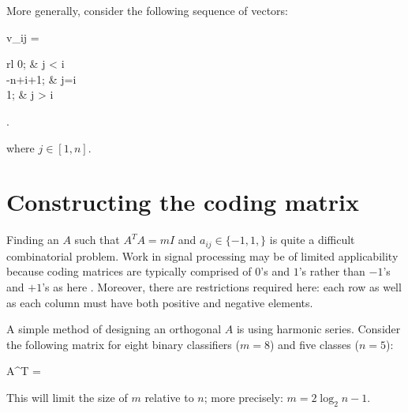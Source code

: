 More generally, consider the following sequence of vectors:
\begin{eqnnon}
	v_{ij} =  \left \lbrace \begin{array}{rl}
			0; & j < i \\
			-n+i+1; & j=i \\
			1; & j > i
		\end{array} \right .
\end{eqnnon}
where $j \in [1, n]$. \citep{Boyd_Vandenberghe2004}


\section{Constructing the coding matrix}

Finding an $A$ such that $A^T A = m I$ and $a_{ij} \in \lbrace -1, 1, \rbrace$
is quite a difficult combinatorial problem.
Work in signal processing may be of limited applicability because coding
matrices are typically comprised of $0$'s and $1$'s rather than $-1$'s and $+1$'s
as here \citep{Hedayat_etal1999,Panse_etal2014}.
Moreover, there are restrictions required here: 
each row as well as each column must have
both positive and negative elements.

A simple method of designing an orthogonal $A$ is using harmonic series.
Consider the following matrix for eight binary classifiers ($m=8$) and
five classes ($n=5$):
\begin{eqnnon}
	A^T = 
\end{eqnnon}
This will limit the size of $m$ relative to $n$; more precisely:
$m=2 \log_2 n - 1$.


